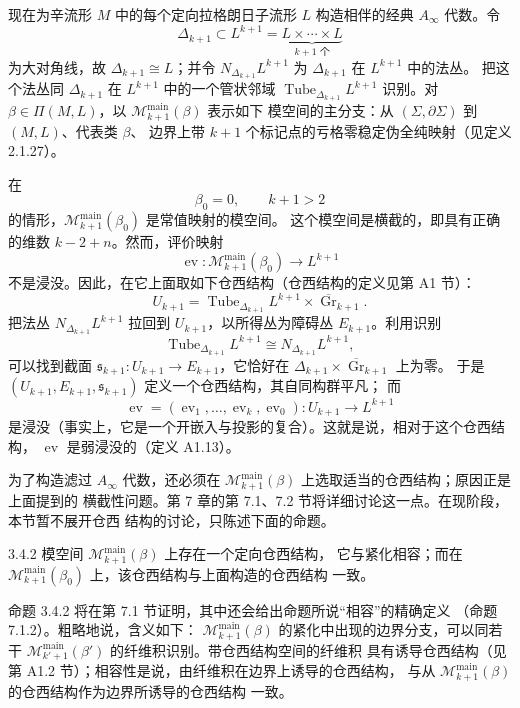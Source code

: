现在为辛流形 $M$ 中的每个定向拉格朗日子流形 $L$ 构造相伴的经典
$A_\infty$ 代数。令
\[
  \Delta_{k+1}\subset L^{k+1}
  =\underbrace{L\times\cdots\times L}_{k+1\text{ 个}}
\]
为大对角线，故 $\Delta_{k+1}\cong L$；并令
$N_{\Delta_{k+1}}L^{k+1}$ 为 $\Delta_{k+1}$ 在 $L^{k+1}$ 中的法丛。
把这个法丛同 $\Delta_{k+1}$ 在 $L^{k+1}$ 中的一个管状邻域
$\operatorname{Tube}_{\Delta_{k+1}}L^{k+1}$ 识别。对
$\beta\in\Pi(M,L)$，以 $\mathcal M_{k+1}^{\mathrm{main}}(\beta)$ 表示如下
模空间的主分支：从 $(\Sigma,\partial\Sigma)$ 到 $(M,L)$、代表类 $\beta$、
边界上带 $k+1$ 个标记点的亏格零稳定伪全纯映射（见定义 2.1.27）。

在
\[
  \beta_0=0,\qquad k+1>2
\]
的情形，$\mathcal M_{k+1}^{\mathrm{main}}(\beta_0)$ 是常值映射的模空间。
这个模空间是横截的，即具有正确的维数 $k-2+n$。然而，评价映射
\[
  \operatorname{ev}\colon
  \mathcal M_{k+1}^{\mathrm{main}}(\beta_0)\longrightarrow L^{k+1}
\]
不是浸没。因此，在它上面取如下仓西结构（仓西结构的定义见第 A1 节）：
\[
  U_{k+1}
  =\operatorname{Tube}_{\Delta_{k+1}}L^{k+1}
  \times\overline{\operatorname{Gr}}_{k+1}.
\]
把法丛 $N_{\Delta_{k+1}}L^{k+1}$ 拉回到 $U_{k+1}$，以所得丛为障碍丛
$E_{k+1}$。利用识别
\[
  \operatorname{Tube}_{\Delta_{k+1}}L^{k+1}
  \cong N_{\Delta_{k+1}}L^{k+1},
\]
可以找到截面
$\mathfrak s_{k+1}\colon U_{k+1}\to E_{k+1}$，它恰好在
$\Delta_{k+1}\times\overline{\operatorname{Gr}}_{k+1}$ 上为零。
于是 $(U_{k+1},E_{k+1},\mathfrak s_{k+1})$ 定义一个仓西结构，其自同构群平凡；
而
\[
  \operatorname{ev}=(\operatorname{ev}_1,\ldots,\operatorname{ev}_k,
  \operatorname{ev}_0)\colon U_{k+1}\longrightarrow L^{k+1}
\]
是浸没（事实上，它是一个开嵌入与投影的复合）。这就是说，相对于这个仓西结构，
$\operatorname{ev}$ 是弱浸没的（定义 A1.13）。

为了构造滤过 $A_\infty$ 代数，还必须在
$\mathcal M_{k+1}^{\mathrm{main}}(\beta)$ 上选取适当的仓西结构；原因正是上面提到的
横截性问题。第 7 章的第 7.1、7.2 节将详细讨论这一点。在现阶段，本节暂不展开仓西
结构的讨论，只陈述下面的命题。

\begin{proposition}{3.4.2}\label{prop:3-4-2}
模空间 $\mathcal M_{k+1}^{\mathrm{main}}(\beta)$ 上存在一个定向仓西结构，
它与紧化相容；而在
$\mathcal M_{k+1}^{\mathrm{main}}(\beta_0)$ 上，该仓西结构与上面构造的仓西结构
一致。
\end{proposition}

命题 3.4.2 将在第 7.1 节证明，其中还会给出命题所说“相容”的精确定义
（命题 7.1.2）。粗略地说，含义如下：
$\mathcal M_{k+1}^{\mathrm{main}}(\beta)$ 的紧化中出现的边界分支，可以同若干
$\mathcal M_{k'+1}^{\mathrm{main}}(\beta')$ 的纤维积识别。带仓西结构空间的纤维积
具有诱导仓西结构（见第 A1.2 节）；相容性是说，由纤维积在边界上诱导的仓西结构，
与从 $\mathcal M_{k+1}^{\mathrm{main}}(\beta)$ 的仓西结构作为边界所诱导的仓西结构
一致。


